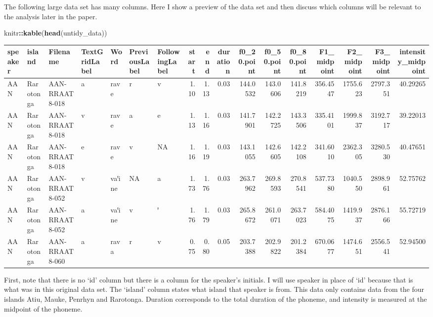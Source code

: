 \documentclass[
  ,man,floatsintext]{apa6}
\newenvironment{Shaded}{\begin{snugshade}}{\end{snugshade}}
\newcommand{\FunctionTok}[1]{\textcolor[rgb]{0.13,0.29,0.53}{\textbf{#1}}}
\newcommand{\NormalTok}[1]{#1}
\newcommand{\SpecialCharTok}[1]{\textcolor[rgb]{0.81,0.36,0.00}{\textbf{#1}}}
\begin{document}
The following large data set has many columns. Here I show a preview of the data set and then discuss which columns will be relevant to the analysis later in the paper.

\begin{Shaded}
\begin{Highlighting}[]
\NormalTok{knitr}\SpecialCharTok{::}\FunctionTok{kable}\NormalTok{(}\FunctionTok{head}\NormalTok{(untidy\_data))}
\end{Highlighting}
\end{Shaded}

\begin{tabular}{l|l|l|l|l|l|l|r|r|r|r|r|r|r|r|r|r}
\hline
speaker & island & Filename & TextGridLabel & Word & PreviousLabel & FollowingLabel & start & end & duration & f0\_20.point & f0\_50.point & f0\_80.point & F1\_midpoint & F2\_midpoint & F3\_midpoint & intensity\_midpoint\\
\hline
AAN & Rarotonga & AAN-RRAAT8-018 & a & rave & r & v & 1.10 & 1.13 & 0.03 & 144.0532 & 143.0606 & 141.8219 & 356.4547 & 1755.623 & 2797.351 & 40.29265\\
\hline
AAN & Rarotonga & AAN-RRAAT8-018 & v & rave & a & e & 1.13 & 1.16 & 0.03 & 141.7901 & 142.2725 & 143.3506 & 335.4101 & 1999.837 & 3192.717 & 39.22013\\
\hline
AAN & Rarotonga & AAN-RRAAT8-018 & e & rave & v & NA & 1.16 & 1.19 & 0.03 & 143.1055 & 142.6605 & 142.2108 & 341.6010 & 2362.305 & 3280.530 & 40.47651\\
\hline
AAN & Rarotonga & AAN-RRAAT8-052 & v & vaꞌine & NA & a & 1.73 & 1.76 & 0.03 & 263.7962 & 269.8593 & 270.8541 & 537.7380 & 1040.550 & 2898.961 & 52.75762\\
\hline
AAN & Rarotonga & AAN-RRAAT8-052 & a & vaꞌine & v & ꞌ & 1.76 & 1.79 & 0.03 & 265.8672 & 261.0071 & 263.7023 & 584.4075 & 1419.937 & 2876.166 & 55.72719\\
\hline
AAN & Rarotonga & AAN-RRAAT8-060 & a & rava & r & v & 0.75 & 0.80 & 0.05 & 203.7388 & 202.9822 & 201.2384 & 670.0677 & 1474.651 & 2556.541 & 52.94500\\
\hline
\end{tabular}

First, note that there is no `id' column but there is a column for the speaker's initials. I will use speaker in place of `id' because that is what was in this original data set. The `island' column states what island that speaker is from. This data only contains data from the four islands Atiu, Mauke, Penrhyn and Rarotonga. Duration corresponds to the total duration of the phoneme, and intensity is measured at the midpoint of the phoneme.
\end{document}
